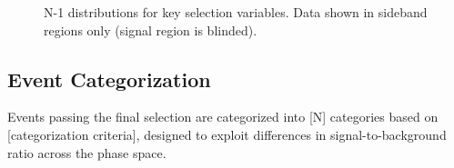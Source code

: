 
\begin{figure}[htbp]
  \centering
  \caption{N-1 distributions for key selection variables. Data shown in
           sideband regions only (signal region is blinded).}
  \label{fig:n_minus_1}
\end{figure}

\subsection{Event Categorization}
\label{sec:selection:categorization}


Events passing the final selection are categorized into [N] categories
based on [categorization criteria], designed to exploit differences in
signal-to-background ratio across the phase space.
